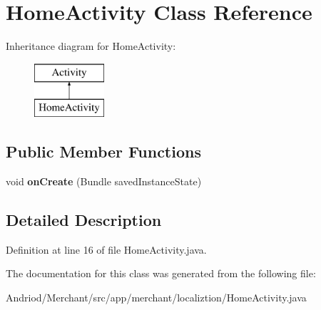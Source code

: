 \hypertarget{classapp_1_1merchant_1_1localiztion_1_1_home_activity}{\section{Home\-Activity Class Reference}
\label{classapp_1_1merchant_1_1localiztion_1_1_home_activity}
}
Inheritance diagram for Home\-Activity\-:\begin{figure}[H]
\begin{center}
\leavevmode
\includegraphics[height=2.000000cm]{classapp_1_1merchant_1_1localiztion_1_1_home_activity}
\end{center}
\end{figure}
\subsection*{Public Member Functions}
\begin{DoxyCompactItemize}
\item 
\hypertarget{classapp_1_1merchant_1_1localiztion_1_1_home_activity_a85e87cb5ced88dff7c8173ecc4f636d1}{void {\bfseries on\-Create} (Bundle saved\-Instance\-State)}\label{classapp_1_1merchant_1_1localiztion_1_1_home_activity_a85e87cb5ced88dff7c8173ecc4f636d1}

\end{DoxyCompactItemize}


\subsection{Detailed Description}


Definition at line 16 of file Home\-Activity.\-java.



The documentation for this class was generated from the following file\-:\begin{DoxyCompactItemize}
\item 
Andriod/\-Merchant/src/app/merchant/localiztion/Home\-Activity.\-java\end{DoxyCompactItemize}
